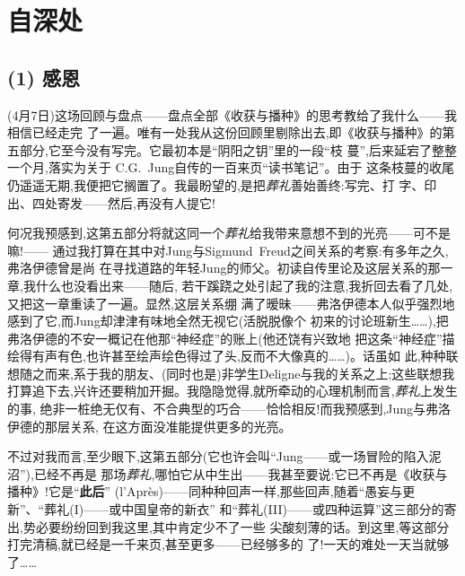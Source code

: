 \section{自深处}

\subsection{(1) 感恩}


(4月7日)这场回顾与盘点——盘点全部《收获与播种》的思考教给了我什么——我相信已经走完
了一遍。唯有一处我从这份回顾里剔除出去,即《收获与播种》的第五部分,它至今没有写完。它最初本是“阴阳之钥”里的一段“枝
蔓”,后来延宕了整整一个月,落实为关于 C.G.~Jung自传的一百来页“读书笔记”。由于
这条枝蔓的收尾仍\dmark{}遥遥无期,我便把它搁置了。我最盼望的,是把\emph{葬礼}善始善终:写完、打
字、印出、四处寄发——然后,再没有人提它!

何况我预感到,这第五部分将就这同一个\emph{葬礼}给我带来意想不到的光亮——可不是嘛!——
通过我打算在其中对Jung与Sigmund~Freud之间关系的考察:有多年之久,弗洛伊德曾是尚
在寻找道路的年轻Jung的师父。初读自传里论及这层关系的那一章,我什么也没看出来——随后,
若干蹊跷之处引起了我的注意,我折回去看了几处,又把这一章重读了一遍。显然,这层关系绷
满了暧昧——弗洛伊德本人似乎强烈地感到了它,而Jung却津津有味地全然无视它(活脱脱像个
初来的讨论班新生……),把弗洛伊德的不安一概记在他那“神经症”的账上(他还饶有兴致地
把这条“神经症”描绘得有声有色,也许甚至绘声绘色得过了头,反而不大像真的……)。话虽如
此,种种联想随之而来,系于我的朋友、(同时也是)非学生Deligne与我的关系之上;这些联想我
打算追下去,兴许还要稍加开掘。我隐隐觉得,就所牵动的心理机制而言,\emph{葬礼}上发生的事,
绝非一桩绝无仅有、不合典型的巧合——恰恰相反!而我预感到,Jung与弗洛伊德的那层关系,
在这方面没准能提供更多的光亮。

不过对我而言,至少眼下,这第五部分(它也许会叫“Jung——或一场冒险的陷入泥沼”),已经不再是
那场\emph{葬礼},哪怕它从中生出——我甚至要说:它已不再是《收获与播种》!它是“\textbf{此后}”
(l'Après)——同种种回声一样,那些回声,随着“愚妄与更新”、“葬礼(I)——或中国皇帝的新衣”
和“葬礼(III)——或四种运算”这三部分的寄出,势必要纷纷回到我这里,其中肯定少不了一些
尖酸刻薄的话。到这里,等这部分打完清稿,就已经是一千来页,甚至更多——已经够多的
了!一天的难处一天当就够了……


